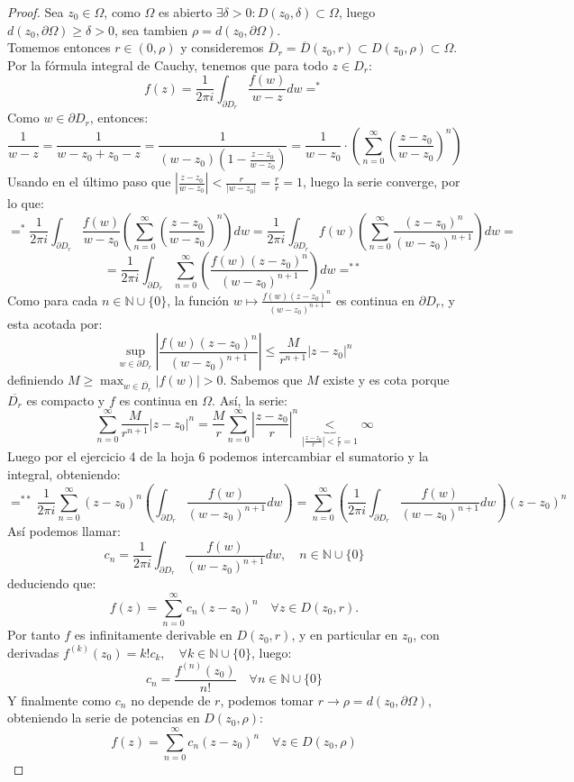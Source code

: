 \begin{proof}
    Sea $z_0 \in \Omega$, como $\Omega$ es abierto $\exists \delta > 0 : D(z_0, \delta) \subset \Omega$, luego $d(z_0, \partial \Omega) \geq \delta > 0$, sea tambien $\rho = d(z_0, \partial \Omega)$.\\
    Tomemos entonces $r \in (0, \rho)$ y consideremos $\overline{D}_r = \overline{D}(z_0, r) \subset D(z_0, \rho) \subset \Omega$. Por la fórmula integral de Cauchy, tenemos que para todo $z \in D_r$:
    \[
        f(z) =
        \frac{1}{2 \pi i} \int_{\partial D_r} \frac{f(w)}{w - z} dw =^*
    \]
    Como $w \in \partial D_r$, entonces:
    \[
    \frac{1}{w-z} = 
    \frac{1}{w - z_0 + z_0 - z} = 
    \frac{1}{(w - z_0)(1 - \frac{z - z_0}{w - z_0})} =
    \frac{1}{w - z_0} \cdot \left( \sum_{n=0}^{\infty} \left( \frac{z - z_0}{w - z_0} \right)^n \right)
    \]
    Usando en el último paso que $\left| \frac{z - z_0}{w - z_0} \right| < \frac{r}{|w-z_0|} = \frac{r}{r} = 1$, luego la serie converge, por lo que:
    \[
    =^* \frac{1}{2 \pi i} \int_{\partial D_r} \frac{f(w)}{w-z_0} \left( \sum_{n=0}^{\infty} \left( \frac{z - z_0}{w - z_0} \right)^n \right) dw =
    \frac{1}{2 \pi i} \int_{\partial D_r} f(w) \left( \sum_{n=0}^{\infty} \frac{(z - z_0)^n}{(w - z_0)^{n+1}} \right) dw =
    \]
    \[
    = \frac{1}{2 \pi i} \int_{\partial D_r} \sum_{n=0}^{\infty} \left(\frac{f(w) (z - z_0)^n}{(w - z_0)^{n+1}}\right)  dw =^{**}
    \]
    Como para cada $n \in \mathbb{N} \cup \{0\}$, la función $w \mapsto \frac{f(w) (z - z_0)^n}{(w - z_0)^{n+1}}$ es continua en $\partial D_r$, y esta acotada por: \[
    \sup_{w \in \partial D_r} \left| \frac{f(w) (z - z_0)^n}{(w - z_0)^{n+1}} \right| \leq \frac{M}{r^{n+1}} |z - z_0|^n
    \] 
    definiendo $M \geq \max_{w \in \overline{D_r}} |f(w)| > 0$. Sabemos que $M$ existe y es cota porque $\overline{D_r}$ es compacto y $f$ es continua en $\Omega$. Así, la serie:
    \[
    \sum_{n=0}^{\infty} \frac{M}{r^{n+1}} |z - z_0|^n =
    \frac{M}{r} \sum_{n=0}^{\infty} \left| \frac{z - z_0}{r} \right|^n
    \underbrace{<}_{\left| \frac{z - z_0}{r} \right| < \frac{r}{r} = 1} \infty
    \]
    Luego por el ejercicio 4 de la hoja 6 podemos intercambiar el sumatorio y la integral, obteniendo:
    \[
    =^{**} \frac{1}{2 \pi i} \sum_{n=0}^{\infty} (z - z_0)^n \left(\int_{\partial D_r} \frac{f(w)}{(w - z_0)^{n+1}} dw \right) =
    \sum_{n=0}^{\infty} \left( \frac{1}{2 \pi i} \int_{\partial D_r} \frac{f(w)}{(w - z_0)^{n+1}} dw \right) (z - z_0)^n
    \]
    Así podemos llamar:
    \[
    c_n =
    \frac{1}{2 \pi i} \int_{\partial D_r} \frac{f(w)}{(w - z_0)^{n+1}} dw, \quad n \in \mathbb{N} \cup \{0\}
    \]
    deduciendo que:
    \[
    f(z) = \sum_{n=0}^{\infty} c_n (z - z_0)^n \quad \forall z \in D(z_0, r).
    \]
    Por tanto $f$ es infinitamente derivable en $D(z_0, r)$, y en particular en $z_0$, con derivadas $f^{(k)}(z_0) = k! c_k, \quad \forall k \in \mathbb{N} \cup \{0\}$, luego:
    \[
    c_n = \frac{f^{(n)}(z_0)}{n!} \quad \forall n \in \mathbb{N} \cup \{0\}
    \]
    Y finalmente como $c_n$ no depende de $r$, podemos tomar $r \to \rho = d(z_0, \partial \Omega)$, obteniendo la serie de potencias en $D(z_0, \rho)$:
    \[
    f(z) = \sum_{n=0}^{\infty} c_n (z - z_0)^n \quad \forall z \in D(z_0, \rho)
    \]
\end{proof}

